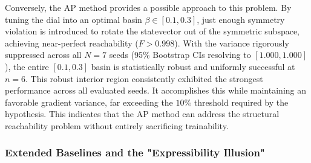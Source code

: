 \documentclass[10pt,twocolumn]{article}
\theoremstyle{remark}
\begin{document}
Conversely, the AP method provides a possible approach to this problem. By tuning the dial into an optimal basin $\beta \in [0.1, 0.3]$, just enough symmetry violation is introduced to rotate the statevector out of the symmetric subspace, achieving near-perfect reachability ($F > 0.998$). With the variance rigorously suppressed across all $N=7$ seeds (95\% Bootstrap CIs resolving to $[1.000, 1.000]$), the entire $[0.1, 0.3]$ basin is statistically robust and uniformly successful at $n=6$. This robust interior region consistently exhibited the strongest performance across all evaluated seeds. It accomplishes this while maintaining an favorable gradient variance, far exceeding the $10\%$ threshold required by the hypothesis. This indicates that the AP method can address the structural reachability problem without entirely sacrificing trainability.

\subsubsection{Extended Baselines and the "Expressibility Illusion"}
\end{document}
